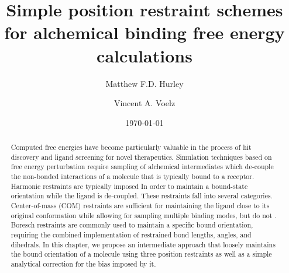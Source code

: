 \documentclass[%
 aip,
rsi,%
 amsmath,amssymb,
 reprint,%
]{revtex4-1}
\begin{document}

\title[Simple restraint schemes for binding free energies]{Simple position restraint schemes for alchemical binding free energy calculations}%




\author{Matthew F.D. Hurley}
\author{Vincent A. Voelz}


\date{\today}%

\begin{abstract}

Computed free energies have become particularly valuable in the process of hit discovery and ligand screening for novel therapeutics. Simulation techniques based on free energy perturbation require sampling of alchemical intermediates which de-couple the non-bonded interactions of a molecule that is typically bound to a receptor. Harmonic restraints are typically imposed In order to maintain a bound-state orientation while the ligand is de-coupled. These restraints fall into several categories. Center-of-mass (COM) restraints are sufficient for maintaining the ligand close to its original conformation while allowing for sampling multiple binding modes, but do not . Boresch restraints are commonly used to maintain a specific bound orientation, requiring the combined implementation of restrained bond lengths, angles, and dihedrals. In this chapter, we propose an intermediate approach that loosely maintains the bound orientation of a molecule using three position restraints as well as a simple analytical correction for the bias imposed by it.
\end{abstract}
\end{document}
